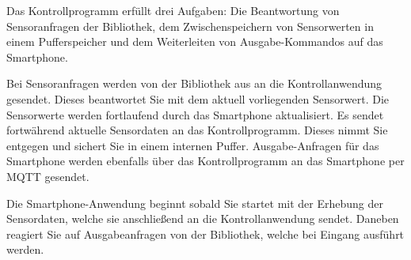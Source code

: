\documentclass[11pt,a4paper]{report}
\begin{document}
Das Kontrollprogramm erfüllt drei Aufgaben: Die Beantwortung von Sensoranfragen der Bibliothek, dem Zwischenspeichern von Sensorwerten in einem Pufferspeicher und dem Weiterleiten von Ausgabe-Kommandos auf das Smartphone.

Bei Sensoranfragen werden von der Bibliothek aus an die Kontrollanwendung gesendet.
Dieses beantwortet Sie mit dem aktuell vorliegenden Sensorwert.
Die Sensorwerte werden fortlaufend durch das Smartphone aktualisiert.
Es sendet fortwährend aktuelle Sensordaten an das Kontrollprogramm.
Dieses nimmt Sie entgegen und sichert Sie in einem internen Puffer.
Ausgabe-Anfragen für das Smartphone werden ebenfalls über das Kontrollprogramm an das Smartphone per MQTT gesendet.

Die Smartphone-Anwendung beginnt sobald Sie startet mit der Erhebung der Sensordaten, welche sie anschließend an die Kontrollanwendung sendet.
Daneben reagiert Sie auf Ausgabeanfragen von der Bibliothek, welche bei Eingang ausführt werden.
\end{document}
